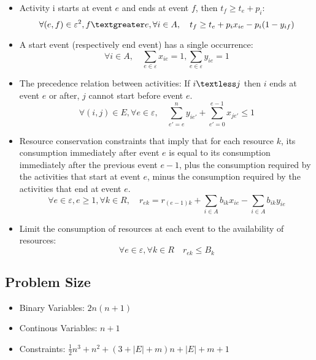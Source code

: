 \documentclass{paper}
\begin{document}
	\begin{itemize}
	\item Activity i starts at event $e$ and ends at event $f$, then $t_f \geq t_e+p_i$: 
	\begin{equation}
		\forall (e,f) \in \varepsilon ^2, f\textgreater e, \forall i \in A, \quad t_f \geq t_e + p_ix_{ie}-p_i(1-y_{if})
	\end{equation}
	\item A start event (respectively end event) has a single occurrence: 
	\begin{equation}
		\forall i \in A, \quad \sum_{e\in \varepsilon}x_{ie}=1, \sum_{e\in \varepsilon}y_{ie}=1
	\end{equation}
	\item The precedence relation between activities: If $i \textless j$ then $i$ ends at event $e$ or after, $j$ cannot start before event $e$.
	\begin{equation}
		\forall (i,j) \in E, \forall e \in \varepsilon ,\quad \sum_{e'= e}^{n}y_{ie'}+\sum_{e'= 0}^{e-1}x_{je'} \leq 1
	\end{equation}
	\item Resource conservation constraints that imply that for each resource $k$, its consumption immediately after event $e$ is equal to its consumption immediately
	after the previous event $e-1$, plus the consumption required by the activities that start at event $e$, minus the consumption required by the activities that end at event $e$.
	\begin{equation}
		\forall e \in \varepsilon, e\geq 1, \forall k\in R,\quad r_{ek}=r_{(e-1)k}+\sum_{i \in A}b_{ik}x_{ie}-\sum_{i \in A}b_{ik}y_{ie} 
	\end{equation}
	\item Limit the consumption of resources at each event to the availability of resources:
	\begin{equation}
		\forall e \in \varepsilon,\forall k \in R \quad r_{ek} \leq B_k
	\end{equation}
	\end{itemize}

	\subsection{Problem Size}
	\begin{itemize}
		\item Binary Variables: $2n(n+1)$
		\item Continous Variables: $n+1$ 
		\item Constraints: $\frac{1}{2}n^3+n^2+(3+\left\lvert E \right\rvert+m)n+\left\lvert E \right\rvert+m+1$ 
	  \end{itemize}
	
\end{document}
